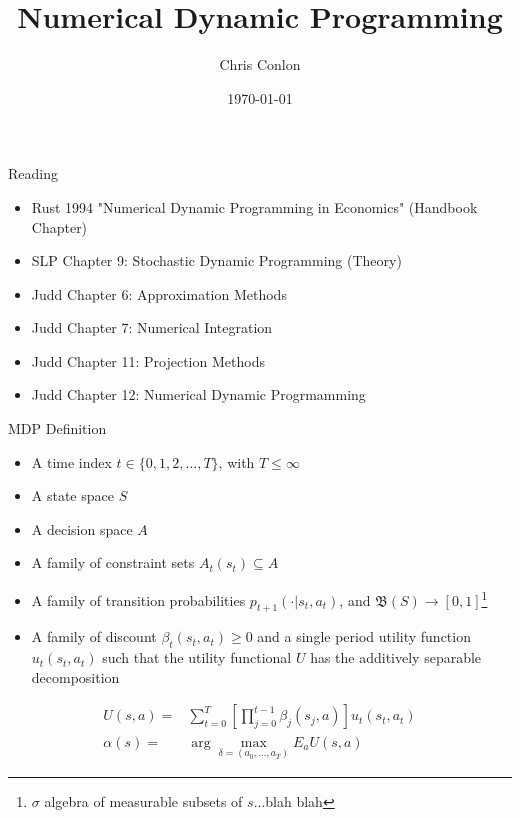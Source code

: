 \documentclass[xcolor=pdftex,dvipsnames,table,mathserif,aspectratio=169]{beamer}
\title [Single-agent dynamic optimization models]{Numerical Dynamic Programming}
\author{Chris Conlon  }
\institute{Grad IO}
\date{\today }
\begin{document}
\begin{frame}
\titlepage
\end{frame}

\begin{frame}{Reading}
\begin{itemize}
\item Rust 1994 "Numerical Dynamic Programming in Economics" (Handbook Chapter)
\item SLP Chapter 9: Stochastic Dynamic Programming (Theory)
\item Judd Chapter 6: Approximation Methods
\item Judd Chapter 7: Numerical Integration
\item Judd Chapter 11: Projection Methods
\item Judd Chapter 12: Numerical Dynamic Progrmamming
\end{itemize}
\end{frame}


\begin{frame}{MDP Definition}
\begin{itemize}
\item A time index $t \in\{0,1,2,\ldots,T\}$, with $T \leq \infty$
\item A state space $S$
\item A decision space $A$
\item A family of constraint sets $A_t(s_t) \subseteq A$
\item A family of transition probabilities $p_{t+1}(\cdot | s_t,a_t)$, and $\mathfrak{B}(S) \rightarrow [0,1]$\footnote{$\sigma$ algebra of measurable subsets of $s$...blah blah}
\item A family of discount $\beta_t(s_t,a_t ) \geq 0$ and a single period utility function $u_t(s_t,a_t)$ such that the utility functional $U$ has the additively separable decomposition
\end{itemize}
\begin{eqnarray*}
U(s,a) = &\sum_{t=0}^T \left [ \prod_{j=0}^{t-1} \beta_j (s_j,a) \right] u_t(s_t,a_t) \\
\alpha(s) =&\arg \max_{\delta=(a_0,\ldots,a_T)} E_{a} U(s,a)
\end{eqnarray*}
\end{frame}
\end{document}
